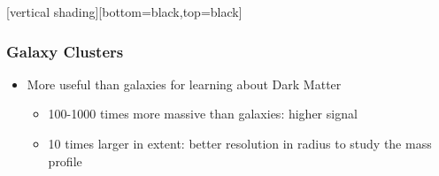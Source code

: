 \documentclass{beamer}
\begin{document}

{
    [vertical shading][bottom=black,top=black]


    \frame
    {
        \frametitle{Galaxy Clusters}

        \begin{itemize}

            \item More useful than galaxies for learning about Dark Matter
            \begin{itemize}

                \item 100-1000 times more massive than galaxies: higher signal

                \item 10 times larger in extent: better resolution in radius to
                    study the mass profile

            \end{itemize}


\end{itemize}}}
\end{document}
